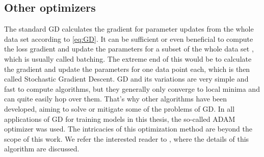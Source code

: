 \subsection{Other optimizers}\label{sec:OtherOptimizers}
The standard GD calculates the gradient for parameter updates from the whole data set according to \cref{eq:GD}. It can be sufficient or even beneficial to compute the loss gradient and update the parameters for a subset of the whole data set \cite{SGDLocalMinima}, which is usually called batching. The extreme end of this would be to calculate the gradient and update the parameters for one data point each, which is then called Stochastic Gradient Descent.
GD and its variations are very simple and fast to compute algorithms, but they generally only converge to local minima and can quite easily hop over them. That's why other algorithms have been developed, aiming to solve or mitigate some of the problems of GD. In all applications of GD for training models in this thesis, the so-called ADAM optimizer was used. The intricacies of this optimization method are beyond the scope of this work. We refer the interested reader to \cite{adamPaper}, where the details of this algorithm are discussed. %


